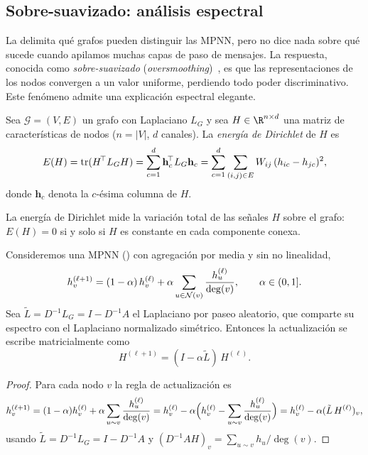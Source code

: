 \subsection{Sobre-suavizado: an\'alisis espectral}
\label{sec:priors:oversmoothing}

La  delimita qu\'e grafos pueden distinguir las MPNN,
pero no dice nada sobre qu\'e sucede cuando apilamos muchas capas de paso de
mensajes. La respuesta, conocida como \emph{sobre-suavizado}
(\emph{oversmoothing})~\citep{li2018deeper}, es que las representaciones de los
nodos convergen a un valor uniforme, perdiendo todo poder discriminativo. Este
fen\'omeno admite una explicaci\'on espectral elegante.

\begin{definition}
\label{def:priors:dirichlet-energy}
Sea $\mathcal{G} = (V, E)$ un grafo con Laplaciano $L_G$ y sea
$H \in \R^{n \times d}$ una matriz de caracter\'isticas de nodos ($n = |V|$, $d$
canales). La \emph{energ\'ia de Dirichlet} de $H$ es
\[
  E(H) = \tr(H^{\!\top} L_G H)
       = \sum_{c=1}^{d} \mathbf{h}_c^{\!\top} L_G \mathbf{h}_c
       = \sum_{c=1}^{d} \sum_{(i,j) \in E} W_{ij}\,(h_{ic} - h_{jc})^2,
\]
donde $\mathbf{h}_c$ denota la $c$-\'esima columna de $H$.
\end{definition}

La energ\'ia de Dirichlet mide la variaci\'on total de las se\~nales $H$ sobre el
grafo: $E(H) = 0$ si y solo si $H$ es constante en cada componente conexa.

\begin{proposition}
\label{prop:priors:mpnn-diffusion}
Consideremos una MPNN () con agregaci\'on por media y sin no
linealidad,
\[
  h_v^{(\ell+1)} = (1 - \alpha)\, h_v^{(\ell)}
      + \alpha \sum_{u \in \Nb(v)} \frac{h_u^{(\ell)}}{\deg(v)},
  \qquad \alpha \in (0, 1].
\]
Sea $\tilde L = D^{-1} L_G = I - D^{-1} A$ el Laplaciano por paseo aleatorio, que
comparte su espectro con el Laplaciano normalizado sim\'etrico. Entonces la
actualizaci\'on se escribe matricialmente como
\[
  H^{(\ell+1)} = (I - \alpha \tilde L)\, H^{(\ell)}.
\]
\end{proposition}

\begin{proof}
Para cada nodo $v$ la regla de actualizaci\'on es
\[
  h_v^{(\ell+1)}
    = (1 - \alpha) h_v^{(\ell)} + \alpha \sum_{u \sim v} \frac{h_u^{(\ell)}}{\deg(v)}
    = h_v^{(\ell)} - \alpha\Bigl(h_v^{(\ell)} - \sum_{u \sim v} \frac{h_u^{(\ell)}}{\deg(v)}\Bigr)
    = h_v^{(\ell)} - \alpha (\tilde L\, H^{(\ell)})_v,
\]
usando $\tilde L = D^{-1} L_G = I - D^{-1} A$ y
$(D^{-1} A H)_v = \sum_{u \sim v} h_u / \deg(v)$. \qedhere
\end{proof}

